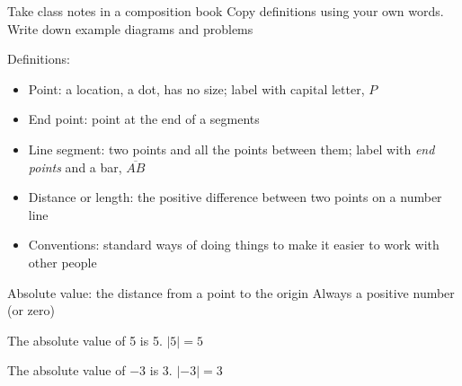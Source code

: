 \begin{frame}{Take class notes in a composition book}
  {Copy definitions using your own words. Write down example diagrams and problems}
  \begin{block}{Definitions:}
    \begin{itemize}
      \item Point: a location, a dot, has no size; label with capital letter, $P$
      \item End point: point at the end of a segments
      \item Line segment: two points and all the points between them; label with \emph{end points} and a bar, $\overline{AB}$
      \item Distance or length: the positive difference between two points on a number line
      \item Conventions: standard ways of doing things to make it easier to work with other people
    \end{itemize}
  \end{block}
\end{frame}

\begin{frame}{Absolute value: the distance from a point to the origin}
  {Always a positive number (or zero)}
     \par \bigskip
    The absolute value of 5 is 5. $|5|=5$ \par \bigskip
    The absolute value of $-3$ is 3. $|-3|=3$
\end{frame}

